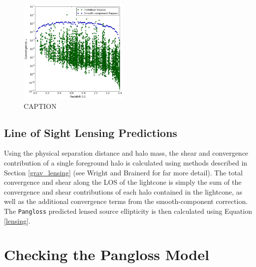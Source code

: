 \documentclass[%
 reprint,
 amsmath,amssymb,
 aps,nofootinbib
]{revtex4-1}
\begin{document}
\begin{figure}
    \centering
    \includegraphics[width=0.475\textwidth]{figs-swe/thesis/kappa_distribution.png}
    \captionsetup{justification=raggedright,singlelinecheck=false}
    \caption{CAPTION}
    \label{fig:kappa_dist}
\end{figure}


\subsection{Line of Sight Lensing Predictions}

Using the physical separation distance and halo mass, the shear and convergence contribution of a single foreground halo is calculated using methods described in Section \ref{grav_lensing} (see Wright and Brainerd \cite{lensing_calc} for far more detail). The total convergence and shear along the LOS of the lightcone is simply the sum of the convergence and shear contributions of each halo contained in the lightcone, as well as the additional convergence terms from the smooth-component correction. The \texttt{Pangloss} predicted lensed source ellipticity is then calculated using Equation \eqref{lensing}.


\section{Checking the Pangloss Model} \label{check}
\end{document}
